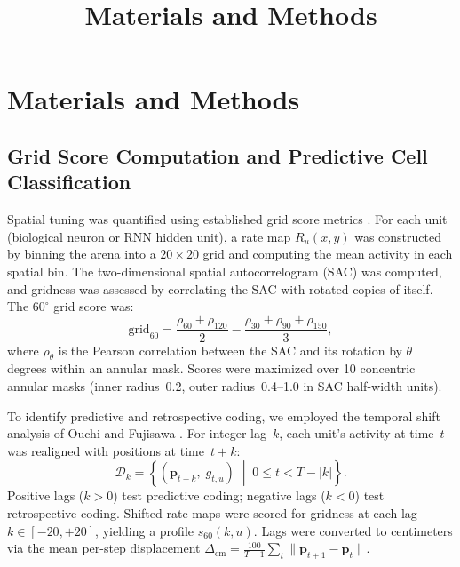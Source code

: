 \documentclass[11pt]{article}
\title{Materials and Methods}
\author{}
\date{}
\begin{document}
\maketitle

\section*{Materials and Methods}


\subsection*{Grid Score Computation and Predictive Cell Classification}

Spatial tuning was quantified using established grid score metrics \cite{sargolini2006}. For each unit (biological neuron or RNN hidden unit), a rate map $R_u(x,y)$ was constructed by binning the arena into a $20 \times 20$ grid and computing the mean activity in each spatial bin. The two-dimensional spatial autocorrelogram (SAC) was computed, and gridness was assessed by correlating the SAC with rotated copies of itself. The $60^\circ$ grid score was:
\begin{equation}
    \mathrm{grid}_{60} = \frac{\rho_{60} + \rho_{120}}{2} - \frac{\rho_{30} + \rho_{90} + \rho_{150}}{3},
\end{equation}
where $\rho_\theta$ is the Pearson correlation between the SAC and its rotation by $\theta$ degrees within an annular mask. Scores were maximized over 10 concentric annular masks (inner radius~0.2, outer radius~0.4--1.0 in SAC half-width units).

To identify predictive and retrospective coding, we employed the temporal shift analysis of Ouchi and Fujisawa \cite{ouchi2024}. For integer lag~$k$, each unit's activity at time~$t$ was realigned with positions at time~$t + k$:
\begin{equation}
    \mathcal{D}_k = \left\{\!\left(\mathbf{p}_{t+k},\; g_{t,u}\right) \;\middle|\; 0 \le t < T - |k| \right\}.
\end{equation}
Positive lags ($k > 0$) test predictive coding; negative lags ($k < 0$) test retrospective coding. Shifted rate maps were scored for gridness at each lag $k \in [-20, +20]$, yielding a profile $s_{60}(k,u)$. Lags were converted to centimeters via the mean per-step displacement $\Delta_{\mathrm{cm}} = \frac{100}{T-1}\sum_{t}\lVert\mathbf{p}_{t+1} - \mathbf{p}_t\rVert$.
\end{document}
